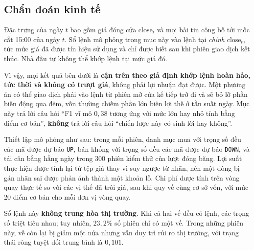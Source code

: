 \documentclass[12pt, a4paper, oneside]{report}
\begin{document}
\subsection{Chẩn đoán kinh tế}
\label{sec:kq-kinh-te}

\begin{tcolorbox}[colback=red!5!white, colframe=red!60!black, title=\textbf{Kết quả trong mục này không giao dịch được}]
Đặc trưng của ngày $t$ bao gồm giá đóng cửa $\text{close}_t$ và mọi bài tin công bố tới mốc cắt 15:00 của ngày $t$. Sổ lệnh mô phỏng trong mục này vào lệnh tại \emph{chính} $\text{close}_t$, tức mức giá đã được tín hiệu sử dụng và chỉ được biết sau khi phiên giao dịch kết thúc. Nhà đầu tư không thể khớp lệnh tại mức giá đó.

Vì vậy, mọi kết quả bên dưới là \textbf{cận trên theo giả định khớp lệnh hoàn hảo, tức thời và không có trượt giá}, không phải lợi nhuận đạt được. Một phương án có thể giao dịch phải vào lệnh từ phiên mở cửa kế tiếp trở đi và sẽ bỏ lỡ phần biến động qua đêm, vốn thường chiếm phần lớn biên lợi thế ở tần suất ngày. Mục này trả lời câu hỏi ``F1 vĩ mô $0{,}38$ tương ứng với mức lớn hay nhỏ tính bằng điểm cơ bản'', \textbf{không} trả lời câu hỏi ``chiến lược này có sinh lời hay không''.
\end{tcolorbox}

Thiết lập mô phỏng như sau: trong mỗi phiên, danh mục mua với trọng số đều các mã được dự báo \texttt{UP}, bán khống với trọng số đều các mã được dự báo \texttt{DOWN}, và tái cân bằng hằng ngày trong 300 phiên kiểm thử của lượt đóng băng. Lợi suất thực hiện được tính lại từ tệp giá thay vì suy ngược từ nhãn, nên một dòng bị gán nhãn sai được phản ánh thành một khoản lỗ. Chi phí được tính trên vòng quay thực tế so với các vị thế đã trôi giá, sau khi quy về cùng cơ sở vốn, với mức 20 điểm cơ bản cho mỗi đơn vị vòng quay.

Sổ lệnh này \textbf{không trung hòa thị trường}. Khi cả hai vế đều có lệnh, các trọng số triệt tiêu nhau; tuy nhiên, $23{,}2\%$ số phiên chỉ có một vế. Trong những phiên này, vế còn lại bị giảm một nửa nhưng vẫn duy trì rủi ro thị trường, với trạng thái ròng tuyệt đối trung bình là $0{,}101$.
\end{document}

